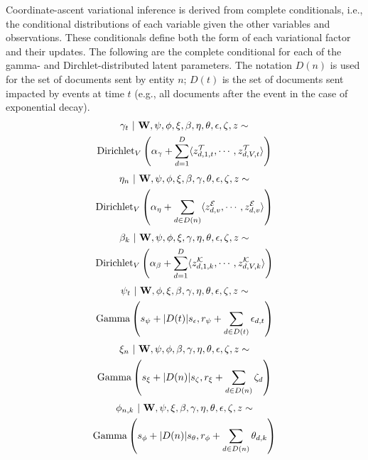 Coordinate-ascent variational inference is derived from complete conditionals, i.e., the conditional distributions of each variable given the other variables and observations. These conditionals define both the form of each variational factor and their updates. The following are the complete conditional for each of the gamma- and Dirchlet-distributed latent parameters.  The notation $D(n)$ is used for the set of documents sent by entity $n$; $D(t)$ is the set of documents sent impacted by events at time $t$ (e.g., all documents after the event in the case of exponential decay).
\begin{multline}
\gamma_t ~\vert~ \mathbf{W}, \psi, \phi, \xi, \beta, \eta, \theta, \epsilon, \zeta, z \sim \\
	\mbox{Dirichlet}_V\left(\alpha_\gamma + \sum_{d=1}^D \langle
		z^\mathcal{T}_{d,1,t}, \cdots, z^\mathcal{T}_{d,V,t}\rangle
	\right)
\label{eq:pi}
\end{multline}
\begin{multline}
\eta_n ~\vert~ \mathbf{W}, \psi, \phi, \xi, \beta, \gamma, \theta, \epsilon, \zeta, z \sim \\
	\mbox{Dirichlet}_V\left(\alpha_\eta + \sum_{d\in D(n)} \langle
		z^\mathcal{E}_{d,v}, \cdots, z^\mathcal{E}_{d,v}\rangle
	\right)
\label{eq:eta}
\end{multline}
\begin{multline}
\beta_k ~\vert~ \mathbf{W}, \psi, \phi, \xi, \gamma, \eta, \theta, \epsilon, \zeta, z \sim \\
	\mbox{Dirichlet}_V\left(\alpha_\beta + \sum_{d=1}^D \langle
		z^\mathcal{K}_{d,1,k}, \cdots, z^\mathcal{K}_{d,V,k}\rangle
	\right)
\label{eq:beta}
\end{multline}
\begin{multline}
\psi_t ~\vert~ \mathbf{W}, \phi, \xi, \beta, \gamma, \eta, \theta, \epsilon, \zeta, z \sim \\
	\mbox{Gamma}\left(
		s_\psi + |D(t)| s_\epsilon,
		r_\psi + \sum_{d\in D(t)} \epsilon_{d,t}
	\right)
\label{eq:psi}
\end{multline}
\begin{multline}
\xi_n ~\vert~ \mathbf{W}, \psi, \phi, \beta, \gamma, \eta, \theta, \epsilon, \zeta, z \sim \\
	\mbox{Gamma}\left(
		s_\xi + |D(n)| s_\zeta,
		r_\xi + \sum_{d\in D(n)} \zeta_{d}
	\right)
\label{eq:xi}
\end{multline}
\begin{multline}
\phi_{n,k} ~\vert~ \mathbf{W}, \psi, \xi, \beta, \gamma, \eta, \theta, \epsilon, \zeta, z \sim \\
	\mbox{Gamma}\left(
		s_\phi + |D(n)| s_\theta,
		r_\phi + \sum_{d\in D(n)} \theta_{d,k}
	\right)
\label{eq:phi}
\end{multline}
